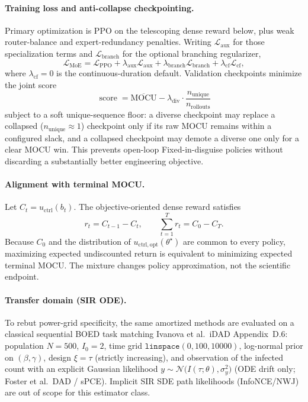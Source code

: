 \documentclass[11pt]{article}
\begin{document}
\paragraph{Training loss and anti-collapse checkpointing.}
Primary optimization is PPO on the telescoping dense reward below, plus weak
router-balance and expert-redundancy penalties. Writing \(\mathcal L_{\mathrm{aux}}\)
for those specialization terms and \(\mathcal L_{\mathrm{branch}}\) for the
optional branching regularizer,
\begin{equation}
\mathcal L_{\mathrm{MoE}}
=
\mathcal L_{\mathrm{PPO}}
+\lambda_{\mathrm{aux}}\mathcal L_{\mathrm{aux}}
+\lambda_{\mathrm{branch}}\mathcal L_{\mathrm{branch}}
+\lambda_{\mathrm{cf}}\mathcal L_{\mathrm{cf}},
\label{eq:moe_training_loss}
\end{equation}
where \(\lambda_{\mathrm{cf}}=0\) is the continuous-duration default. Validation checkpoints
minimize the joint score
\begin{equation}
\operatorname{score}
=
\overline{\mathrm{MOCU}}
-
\lambda_{\mathrm{div}}\cdot
\frac{n_{\mathrm{unique}}}{n_{\mathrm{rollouts}}}
\label{eq:moe_joint_score}
\end{equation}
subject to a soft unique-sequence floor: a diverse checkpoint may replace a
collapsed (\(n_{\mathrm{unique}}\!\approx\!1\)) checkpoint only if its raw MOCU
remains within a configured slack, and a collapsed checkpoint may demote a
diverse one only for a clear MOCU win. This prevents open-loop Fixed-in-disguise
policies without discarding a substantially better engineering objective.

\paragraph{Alignment with terminal MOCU.}
Let \(C_t=u_{\mathrm{ctrl}}(b_t)\). The objective-oriented dense reward
satisfies
\begin{equation}
r_t=C_{t-1}-C_t,\qquad
\sum_{t=1}^{T}r_t=C_0-C_T.
\label{eq:moe_telescoping_reward}
\end{equation}
Because \(C_0\) and the distribution of
\(u_{\mathrm{ctrl,opt}}(\theta^\star)\) are common to every policy,
maximizing expected undiscounted return is equivalent to minimizing expected
terminal MOCU. The mixture changes policy approximation, not the scientific
endpoint.

\paragraph{Transfer domain (SIR ODE).}
To rebut power-grid specificity, the same amortized methods are evaluated on a
classical sequential BOED task matching Ivanova et al.~iDAD Appendix~D.6:
population \(N=500\), \(I_0=2\), time grid
\(\texttt{linspace}(0,100,10000)\), log-normal prior on \((\beta,\gamma)\),
design \(\xi=\tau\) (strictly increasing), and observation of the infected
count with an explicit Gaussian likelihood
\(y\sim\mathcal N\bigl(I(\tau;\theta),\sigma_y^2\bigr)\) (ODE drift only;
Foster et al.~DAD / sPCE). Implicit SIR SDE path likelihoods (InfoNCE/NWJ)
are out of scope for this estimator class.
\end{document}
